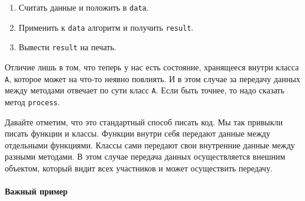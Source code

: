 \begin{enumerate}
\item Считать данные и положить в \verb"data".

\item Применить к \verb"data" алгоритм и получить \verb"result".

\item Вывести \verb"result" на печать.
\end{enumerate}
Отличие лишь в том, что теперь у нас есть состояние, хранящееся внутри класса \verb"A", которое может на что-то неявно повлиять.
И в этом случае за передачу данных между методами отвечает по сути класс \verb"A".
Если быть точнее, то надо сказать метод \verb"process".

Давайте отметим, что это стандартный способ писать код.
Мы так привыкли писать функции и классы.
Функции внутри себя передают данные между отдельными функциями.
Классы сами передают свои внутренние данные между разными методами.
В этом случае передача данных осуществляется внешним объектом, который видит всех участников и может осуществить передачу.


\paragraph{Важный пример}

